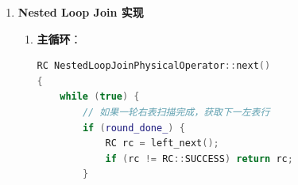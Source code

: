 \documentclass[a4paper, 12pt]{article}
\begin{document}
\begin{enumerate}
\begin{enumerate}
        \item \textbf{探测阶段}：处理左表行并匹配
        
\begin{lstlisting}[language=C++]
RC HashJoinPhysicalOperator::next()
{
    // 未设置等值键时退化为嵌套循环
    if (left_join_field_.meta() == nullptr) {
        return nested_loop_next();
    }
    
    // 正常Hash Join流程
    if (!current_matches_ || current_match_iter_ == current_matches_->end()) {
        RC rc = probe_hash_table();
        if (rc != RC::SUCCESS) return rc;
    }
    
    // 获取下一个匹配
    right_tuple_ = *current_match_iter_;
    ++current_match_iter_;
    
    // 应用额外过滤条件
    if (!evaluate_filter_conditions(left_tuple_, right_tuple_)) {
        return this->next(); // 跳过不匹配的行
    }
    
    // 组合结果
    joined_tuple_.set_left(left_tuple_);
    joined_tuple_.set_right(right_tuple_);
    
    return RC::SUCCESS;
}
        \end{lstlisting}
        
        \item \textbf{过滤处理}：
        
\begin{lstlisting}[language=C++]
bool HashJoinPhysicalOperator::evaluate_filter_conditions(Tuple *left_tuple, Tuple *right_tuple)
{
    JoinedTuple joined_tuple(left_tuple, right_tuple);
    
    for (auto &expr : filter_expressions_) {
        Value value;
        expr->get_value(joined_tuple, value);
        
        // 任一条件为假则返回false
        if (value.is_null() || !value.get_boolean()) {
            return false;
        }
    }
    return true;
}
        \end{lstlisting}
    \end{enumerate}
    
    \item \textbf{Nested Loop Join 实现}
    
\begin{enumerate}
        \item \textbf{主循环}：
        \begin{lstlisting}[language=C++]
RC NestedLoopJoinPhysicalOperator::next()
{
    while (true) {
        // 如果一轮右表扫描完成，获取下一左表行
        if (round_done_) {
            RC rc = left_next();
            if (rc != RC::SUCCESS) return rc;
        }
        

\end{lstlisting}
\end{enumerate}
\end{enumerate}
\end{document}
